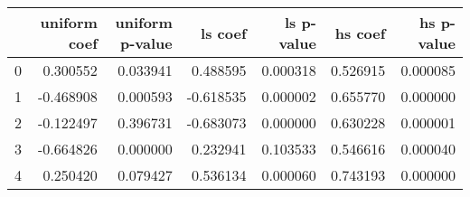 \begin{tabular}{lrrrrrr}
\toprule
 & uniform coef & uniform p-value & ls coef & ls p-value & hs coef & hs p-value \\
\midrule
0 & 0.300552 & 0.033941 & 0.488595 & 0.000318 & 0.526915 & 0.000085 \\
1 & -0.468908 & 0.000593 & -0.618535 & 0.000002 & 0.655770 & 0.000000 \\
2 & -0.122497 & 0.396731 & -0.683073 & 0.000000 & 0.630228 & 0.000001 \\
3 & -0.664826 & 0.000000 & 0.232941 & 0.103533 & 0.546616 & 0.000040 \\
4 & 0.250420 & 0.079427 & 0.536134 & 0.000060 & 0.743193 & 0.000000 \\
\bottomrule
\end{tabular}
